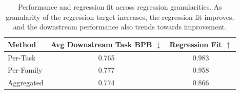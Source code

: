 \begin{table}[t]
\centering
\caption{Performance and regression fit across regression granularities. As granularity of the regression target increases, the regression fit improves, and the downstream performance also trends towards improvement.}
\begin{tabular}{lcc}
\toprule
Method & Avg Downstream Task BPB $\downarrow$ & Regression Fit $\uparrow$ \\
\midrule
\rowcolor{ai2lightpink} Per-Task      & 0.765 & 0.983 \\
Per-Family    & 0.777 & 0.958 \\
Aggregated    & 0.774 & 0.866 \\
\bottomrule
\end{tabular}
\label{tab:granularity}
\end{table}
